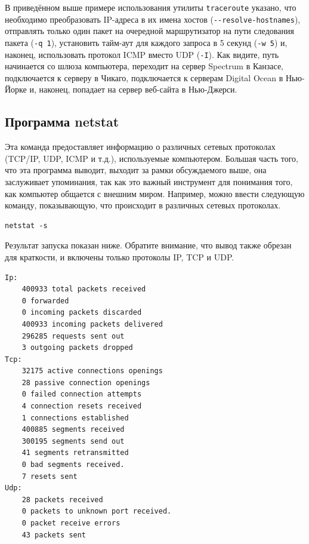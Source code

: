 \documentclass[a4paper,12pt,final,openany]{extbook}
\begin{document}
В приведённом выше примере использования утилиты \texttt{traceroute} указано, что необходимо
преобразовать IP-адреса в их имена хостов
(\texttt{-\/-resolve-hostnames}), отправлять только один пакет на
очередной маршрутизатор на пути следования пакета (\texttt{-q\ 1}),
установить тайм-аут для каждого запроса в 5 секунд (\texttt{-w\ 5}) и,
наконец, использовать протокол ICMP вместо UDP (\texttt{-I}). Как
видите, путь начинается со шлюза компьютера, переходит на сервер
Spectrum в Канзасе, подключается к серверу в Чикаго, подключается к
серверам Digital Ocean в Нью-Йорке и, наконец, попадает на сервер
веб-сайта в Нью-Джерси. %

\hypertarget{netstat}{%
\subsection{\texorpdfstring{\protect\hyperlink{netstat}{}Программа
netstat}{Программа netstat}}\label{netstat}}

Эта команда предоставляет информацию о различных сетевых протоколах
(TCP/IP, UDP, ICMP и т.д.), используемые компьютером. Большая часть
того, что эта программа выводит, выходит за рамки обсуждаемого выше, она
заслуживает упоминания, так как это важный инструмент для понимания
того, как компьютер общается с внешним миром. Например, можно ввести
следующую команду, показывающую, что происходит в различных сетевых протоколах.
\begin{verbatim}
netstat -s
\end{verbatim}

Результат запуска показан ниже. Обратите внимание, что вывод также
обрезан для краткости, и включены только протоколы IP, TCP и UDP.
\begin{verbatim}
Ip:
    400933 total packets received
    0 forwarded
    0 incoming packets discarded
    400933 incoming packets delivered
    296285 requests sent out
    3 outgoing packets dropped
Tcp:
    32175 active connections openings
    28 passive connection openings
    0 failed connection attempts
    4 connection resets received
    1 connections established
    400885 segments received
    300195 segments send out
    41 segments retransmitted
    0 bad segments received.
    7 resets sent
Udp:
    28 packets received
    0 packets to unknown port received.
    0 packet receive errors
    43 packets sent
\end{verbatim}
\end{document}
